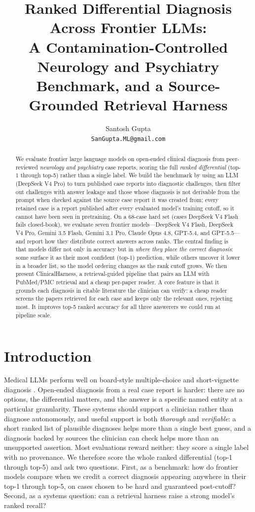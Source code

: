 \documentclass{article}
\title{Ranked Differential Diagnosis Across Frontier LLMs:\\ A Contamination-Controlled Neurology and Psychiatry Benchmark, and a Source-Grounded Retrieval Harness}
\author{\parbox{\linewidth}{\centering Santosh Gupta\\[2pt] \normalfont\texttt{SanGupta.ML@gmail.com}}}
\date{}
\begin{document}
\maketitle

\begin{abstract}
We evaluate frontier large language models on open-ended clinical diagnosis from peer-reviewed
\emph{neurology and psychiatry} case reports, scoring the full \emph{ranked differential} (top-1 through
top-5) rather than a single label. We build the benchmark by using an LLM (DeepSeek V4 Pro) to turn
published case reports into diagnostic challenges, then filter out challenges with answer leakage and those
whose diagnosis is not derivable from the prompt when checked against the source case report it was created
from; every retained case is a report published after every evaluated model's training cutoff, so it cannot
have been seen in pretraining. On a 68-case hard set
(cases DeepSeek V4 Flash fails closed-book), we evaluate seven frontier models---DeepSeek V4 Flash, DeepSeek
V4 Pro, Gemini 3.5 Flash, Gemini 3.1 Pro, Claude Opus 4.8, GPT-5.4, and GPT-5.5---and report how they
distribute correct answers across ranks. The central finding is that models differ not only in accuracy but in \emph{where they
place the correct diagnosis}: some surface it as their most confident (top-1) prediction, while others uncover
it lower in a broader list, so the model ordering changes as the rank cutoff grows.
We then present ClinicalHarness, a retrieval-guided pipeline that pairs an LLM with PubMed/PMC retrieval and
a cheap per-paper reader. A core feature is that it grounds each diagnosis in citable literature the clinician
can verify: a cheap reader screens the papers retrieved for each case and keeps only the relevant ones,
rejecting most. It improves top-5 ranked accuracy for all three answerers we could run at pipeline scale.
\end{abstract}

\section{Introduction}

Medical LLMs perform well on board-style multiple-choice and short-vignette diagnosis
\citep{MedPaLM,MedMCQA,PubMedQA}. Open-ended diagnosis from a real case report is harder: there are no
options, the differential matters, and the answer is a specific named entity at a particular granularity.
These systems should support a clinician rather than diagnose autonomously, and useful support is both
\emph{thorough} and \emph{verifiable}: a short ranked list of plausible diagnoses helps more than a single
best guess, and a diagnosis backed by sources the clinician can check helps more than an unsupported
assertion. Most evaluations reward neither: they score a single label with no provenance. We therefore score
the whole ranked differential (top-1 through top-5) and ask two
questions. First, as a benchmark: how do frontier models compare when we credit a correct diagnosis
appearing anywhere in their top-1 through top-5, on cases chosen to be hard and guaranteed post-cutoff?
Second, as a systems question: can a retrieval harness raise a strong model's ranked recall?
\end{document}
